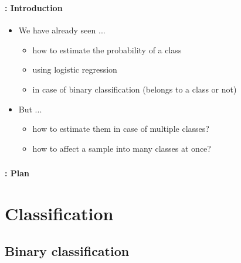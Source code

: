 \documentclass[xcolor=table]{beamer}
\subtitle[Multi-class/label] %
{Multi-class and multi-label classification}
\begin{document}
	
\begin{frame}
	\frametitle{\inserttitle}
	\framesubtitle{\insertshortsubtitle: Introduction}
	
	\begin{itemize}
		\item We have already seen ...
		\begin{itemize}
			\item how to estimate the probability of a class
			\item using logistic regression
			\item in case of binary classification (belongs to a class or not)
		\end{itemize}
		\item But ...
		\begin{itemize}
			\item how to estimate them in case of multiple classes?
			\item how to affect a sample into many classes at once?
		\end{itemize}

	\end{itemize}
\end{frame}


\begin{frame}
	\frametitle{\inserttitle}
	\framesubtitle{\insertshortsubtitle: Plan}
	
	\begin{multicols}{2}
		\tableofcontents
	\end{multicols}
\end{frame}

\section{Classification}

\begin{frame}
	\frametitle{\insertshortsubtitle}
	\framesubtitle{\insertsection}
	
	
\end{frame}

\subsection{Binary classification}
\end{document}
